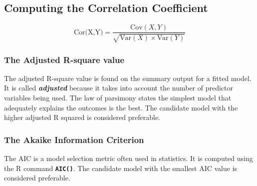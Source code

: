 \documentclass[]{report}
\begin{document}
\subsection{Computing the Correlation Coefficient}

\[ \mbox{Cor(X,Y)} = \frac{\mbox{Cov}(X,Y)}{\sqrt{\mbox{Var}(X) \times \mbox{Var}(Y)}} \]









\subsubsection*{The Adjusted R-square value}
\noindent The adjusted R-square value is found on the summary output for a fitted model. It is called \textbf{\emph{adjusted}} because it takes into account the number of predictor variables being used. The law of parsimony states the simplest model that adequately explains the outcomes is the best. The candidate model with the higher adjusted R squared is considered preferable.

\subsubsection*{The Akaike Information Criterion}
\noindent The AIC is a model selection metric often used in statistics. It is computed using the R command
\texttt{\textbf{AIC()}}. The candidate model with the smallest AIC value is considered preferable.
\end{document}
